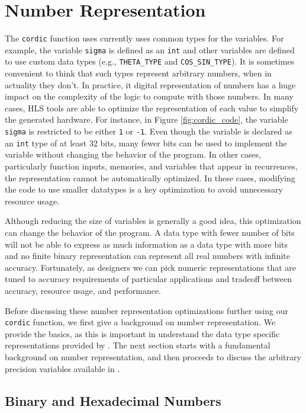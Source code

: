 \section{Number Representation}
\label{sec:number_representation}

The \lstinline{cordic} function uses currently uses common types for the variables. For example, the variable \lstinline{sigma} is defined as an \lstinline{int} and other variables are defined to use custom data types (e.g., \lstinline{THETA_TYPE} and \lstinline{COS_SIN_TYPE}).  It is sometimes convenient to think that such types represent arbitrary numbers, when in actuality they don't.  In practice, it digital representation of numbers has a huge impact on the complexity of the logic to compute with those numbers.   In many cases, HLS tools are able to optimize the representation of each value to simplify the generated hardware.  For instance, in Figure \ref{fig:cordic_code}, the variable \lstinline{sigma} is restricted to be either \lstinline{1} or \lstinline{-1}.  Even though the variable is declared as an \lstinline{int} type of at least 32 bits, many fewer bits can be used to implement the variable without changing the behavior of the program. In other cases, particularly function inputs, memories, and variables that appear in recurrences, the representation cannot be automatically optimized.  In these cases, modifying the code to use smaller datatypes is a key optimization to avoid unnecessary resource usage.

Although reducing the size of variables is generally a good idea, this optimization can change the behavior of the program. A data type with fewer number of bits will not be able to express as much information as a data type with more bits and no finite binary representation can represent all real numbers with infinite accuracy. Fortunately, as designers we can pick numeric representations that are tuned to accuracy requirements of particular applications and tradeoff between accuracy, resource usage, and performance.

Before discussing these number representation optimizations further using our \lstinline{cordic} function, we first give a background on number representation. We provide the basics, as this is important in understand the data type specific representations provided by \VHLS. The next section starts with a fundamental background on number representation, and then proceeds to discuss the arbitrary precision variables available in \VHLS.

\subsection{Binary and Hexadecimal Numbers}


